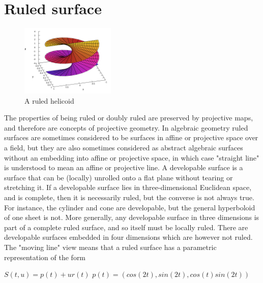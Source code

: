 \documentclass[openany,a4paper,12pt]{book}
\begin{document}
\section{Ruled surface}
\begin{figure}
	\centering
    \includegraphics[width=0.4\textwidth]{picture8.png}
    
    \caption{A ruled helicoid}
\end{figure}
The properties of being ruled or doubly ruled are preserved by projective maps, and therefore are concepts of projective geometry. In algebraic geometry ruled surfaces are sometimes considered to be surfaces in affine or projective space over a field, but they are also sometimes considered as abstract algebraic surfaces without an embedding into affine or projective space, in which case "straight line" is understood to mean an affine or projective line. A developable surface is a surface that can be (locally) unrolled onto a flat plane without tearing or stretching it. If a developable surface lies in three-dimensional Euclidean space, and is complete, then it is necessarily ruled, but the converse is not always true. For instance, the cylinder and cone are developable, but the general hyperboloid of one sheet is not. More generally, any developable surface in three dimensions is part of a complete ruled surface, and so itself must be locally ruled. There are developable surfaces embedded in four dimensions which are however not ruled.
\newline \newline
The "moving line" view means that a ruled surface has a parametric representation of the form

$S(t, u)= p(t)+ur(t)$
$p(t)=(cos(2t),sin(2t),cos(t)sin(2t))$

\listoftables
\listoffigures

\end{document}
